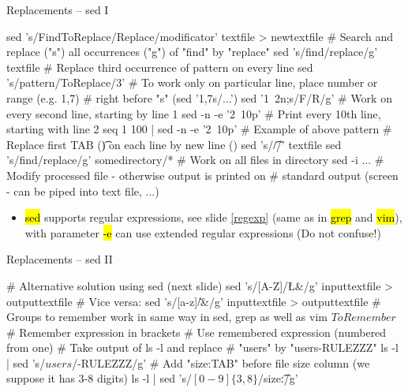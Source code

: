 \documentclass[compress, ucs, xelatex, 11pt, xcolor=svgnames,
  hyperref={
    bookmarks=true,
    unicode=true,
    colorlinks=true,
    pdftitle={Linux, command line and MetaCentrum},
    plainpages=false,
    pdfauthor={Vojtech Zeisek},
    pdfsubject={Course about use of Linux command line, writing shell scripts and using MetaCentrum of CESNET},
    pdfcreator={XeLaTeX},
    pdfkeywords={Linux, GNU, BASH, shell, command line, MetaCentrum},
    linkcolor=DarkRed,
    anchorcolor=DarkBlue,
    citecolor=Indigo,
    filecolor=NavyBlue,
    menucolor=DarkMagenta,
    urlcolor=DarkBlue,
    pdftex},
  url={hyphens, lowtilde} %
  ]{beamer}
\renewcommand{\texttt}[1]{\hl{\ttfamily #1}}
\begin{document}
\begin{frame}[fragile]{Replacements -- sed I}
  \begin{bashcode}
    sed 's/FindToReplace/Replace/modificator' textfile > newtextfile
    # Search and replace ("s") all occurrences ("g") of "find" by "replace"
    sed 's/find/replace/g' textfile
    # Replace third occurrence of pattern on every line
    sed 's/pattern/ToReplace/3'
    # To work only on particular line, place number or range (e.g. 1,7)
    # right before "s" (sed '1,7s/...')
    sed '1~2n;s/F/R/g' # Work on every second line, starting by line 1
    sed -n -e '2~10p' # Print every 10th line, starting with line 2
    seq 1 100 | sed -n -e '2~10p' # Example of above pattern
    # Replace first TAB (\t) on each line by new line (\n)
    sed 's/\t/\n/' textfile
    sed 's/find/replace/g' somedirectory/* # Work on all files in directory
    sed -i ... # Modify processed file - otherwise output is printed on
               # standard output (screen - can be piped into text file, ...)
  \end{bashcode}
  \begin{itemize}
    \item \texttt{sed} supports regular expressions, see slide \ref{regexp} (same as in \texttt{grep} and \texttt{vim}), with parameter \texttt{-e} can use extended regular expressions (Do not confuse!)
  \end{itemize}
\end{frame}

\begin{frame}[fragile]{Replacements -- sed II}
  \begin{bashcode}
    # Alternative solution using sed (next slide)
    sed 's/[A-Z]/\L&/g' inputtextfile > outputtextfile # Vice versa:
    sed 's/[a-z]/\U&/g' inputtextfile > outputtextfile
    # Groups to remember work in same way in sed, grep as well as vim
    \(ToRemember\) # Remember expression in brackets
    \Number # Use remembered expression (numbered from one)
    # Take output of ls -l and replace # "users" by "users-RULEZZZ"
    ls -l | sed 's/\(users\)/\1-RULEZZZ/g'
    # Add "size:TAB" before file size column (we suppose it has 3-8 digits)
    ls -l | sed 's/\([0-9]\{3,8\}\)/size:\t\1/g'
  \end{bashcode}
\end{frame}
\end{document}
